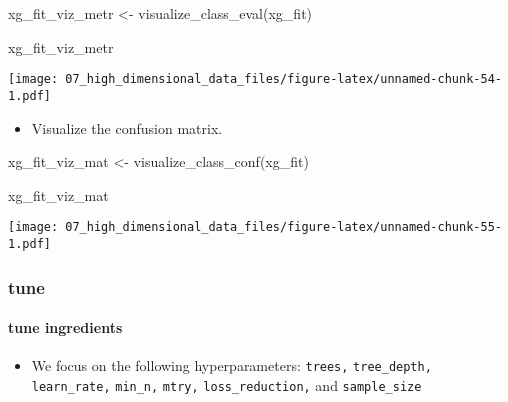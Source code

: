 \documentclass[
]{book}
\newenvironment{Shaded}{\begin{snugshade}}{\end{snugshade}}
\newcommand{\FunctionTok}[1]{\textcolor[rgb]{0.00,0.00,0.00}{#1}}
\newcommand{\NormalTok}[1]{#1}
\newcommand{\OtherTok}[1]{\textcolor[rgb]{0.56,0.35,0.01}{#1}}
\providecommand{\tightlist}{%
  \setlength{\itemsep}{0pt}\setlength{\parskip}{0pt}}
\begin{document}
\begin{Shaded}
\begin{Highlighting}[]
\NormalTok{xg\_fit\_viz\_metr }\OtherTok{\textless{}{-}}
  \FunctionTok{visualize\_class\_eval}\NormalTok{(xg\_fit)}

\NormalTok{xg\_fit\_viz\_metr}
\end{Highlighting}
\end{Shaded}

\texttt{[image: 07\_high\_dimensional\_data\_files/figure-latex/unnamed-chunk-54-1.pdf]}

\begin{itemize}
\tightlist
\item
  Visualize the confusion matrix.
\end{itemize}

\begin{Shaded}
\begin{Highlighting}[]
\NormalTok{xg\_fit\_viz\_mat }\OtherTok{\textless{}{-}}
  \FunctionTok{visualize\_class\_conf}\NormalTok{(xg\_fit)}

\NormalTok{xg\_fit\_viz\_mat}
\end{Highlighting}
\end{Shaded}

\texttt{[image: 07\_high\_dimensional\_data\_files/figure-latex/unnamed-chunk-55-1.pdf]}

\hypertarget{tune-3}{%
\subsubsection{tune}\label{tune-3}}

\hypertarget{tune-ingredients-3}{%
\paragraph{tune ingredients}\label{tune-ingredients-3}}

\begin{itemize}
\tightlist
\item
  We focus on the following hyperparameters: \texttt{trees,} \texttt{tree\_depth,} \texttt{learn\_rate,} \texttt{min\_n,} \texttt{mtry,} \texttt{loss\_reduction,} and \texttt{sample\_size}
\end{itemize}
\end{document}
